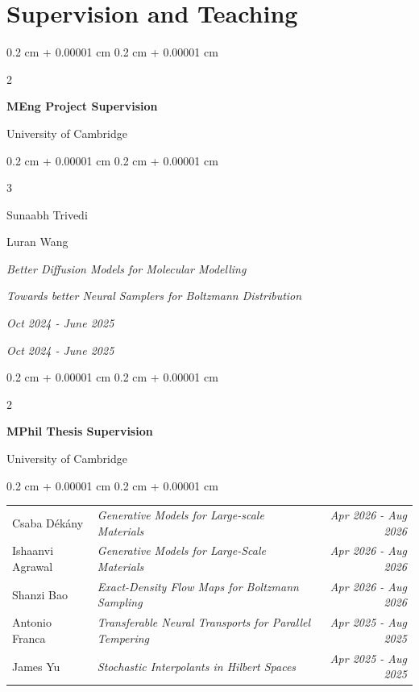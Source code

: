 \documentclass[10pt, letterpaper]{article}
\newenvironment{onecolentry}{
    \begin{adjustwidth}{
        0.2 cm + 0.00001 cm
    }{
        0.2 cm + 0.00001 cm
    }
}{
    \end{adjustwidth}
} %
\newenvironment{twocolentry}[2][]{
    \onecolentry
    \def\secondColumn{#2}
    \setcolumnwidth{\fill, 4.5 cm}
    \begin{paracol}{2}
}{
    \switchcolumn \raggedleft \secondColumn
    \end{paracol}
    \endonecolentry
} %
\newenvironment{threecolentry}[3][]{
  \onecolentry
  \def\secondColumn{#2}
  \def\thirdColumn{#3}
  \setcolumnwidth{\fill,10cm,4.5cm}
  \begin{paracol}{3}
}{
  \switchcolumn        %
    \raggedright\secondColumn
  \switchcolumn        %
    \raggedleft\thirdColumn
  \end{paracol}
  \endonecolentry
}
\begin{document}
    \section{Supervision and Teaching}
    \begin{twocolentry}
        {
        University of Cambridge
        }
    \textbf{MEng Project Supervision}
    \end{twocolentry}
    \begin{threecolentry}
        {
        \textit{Better Diffusion Models for Molecular Modelling}
        
        \textit{Towards better Neural Samplers for Boltzmann Distribution}
        }
        {
        \textit{Oct 2024 - June 2025}
        
        \textit{Oct 2024 - June 2025}
        }
        Sunaabh Trivedi

        Luran Wang
    \end{threecolentry}
    \begin{twocolentry}
        {
        University of Cambridge
        }
    \textbf{MPhil Thesis Supervision}
    \end{twocolentry}
    \begin{onecolentry}
        \begin{tabularx}{\linewidth}{@{}p{3.0cm}Xr@{}}
            Csaba Dékány & \textit{Generative Models for Large-scale Materials} & \textit{Apr 2026 - Aug 2026} \\
            Ishaanvi Agrawal & \textit{Generative Models for Large-Scale Materials} & \textit{Apr 2026 - Aug 2026} \\
            Shanzi Bao & \textit{Exact-Density Flow Maps for Boltzmann Sampling} & \textit{Apr 2026 - Aug 2026} \\
            Antonio Franca & \textit{Transferable Neural Transports for Parallel Tempering} & \textit{Apr 2025 - Aug 2025} \\
            James Yu & \textit{Stochastic Interpolants in Hilbert Spaces} & \textit{Apr 2025 - Aug 2025} \\
        \end{tabularx}
    \end{onecolentry}

        
\end{document}
